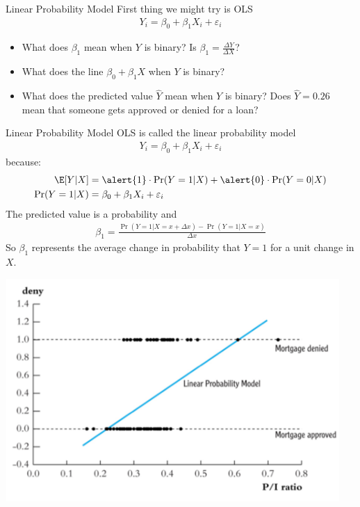 \documentclass[aspectratio=169,11pt]{beamer}
\begin{document}
\begin{frame}{Linear Probability Model}
First thing we might try is OLS
\begin{align*}
Y_i  = \beta_0 + \beta_1 X_i + \varepsilon_i
\end{align*}
\begin{itemize}
\item What does $\beta_1$ mean when $Y$ is binary? Is $\beta_1  = \frac{\Delta Y}{\Delta X}$?
\item What does the line $\beta_0 + \beta_1 X$ when $Y$ is binary?
\item What does the predicted value $\hat{Y}$ mean when $Y$ is binary? Does $\hat{Y} = 0.26$ mean that someone gets approved or denied for a loan?
\end{itemize}
\end{frame}

\begin{frame}{Linear Probability Model}
OLS is called the \alert{linear probability model} 
\begin{align*}
Y_i  = \beta_0 + \beta_1 X_i + \varepsilon_i 
\end{align*}
because:
\begin{align*}
\E[Y | X] &= \alert{1} \cdot \Pr(Y=1 | X) + \alert{0} \cdot \Pr(Y=0  | X) \\
\Pr(Y=1 | X) &= \beta_0 + \beta_1 X_i + \varepsilon_i
\end{align*}
The predicted value is a \alert{probability} and 
\begin{align*}
\beta_1 = \frac{\Pr(Y=1 | X =x+\Delta x) - \Pr(Y=1 | X=x)}{\Delta x}
\end{align*}
So $\beta_1$ represents the average change in probability that $Y=1$ for a unit change in $X$.
\end{frame}


\begin{frame}
\begin{center}
\includegraphics[width=5in]{resources/lpm.pdf}\\
\end{center}
\end{frame}
\end{document}
